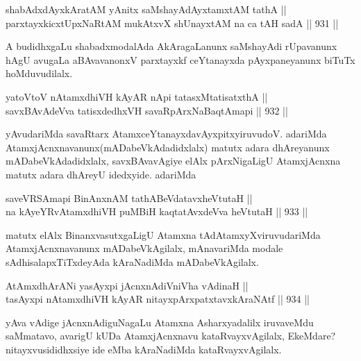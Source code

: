 
\begin{shl}
shabAdxdAyxkAratAM yAnitx saMshayAdAyxtamxtAM tathA ||  \\
parxtayxkicxtUpxNaRtAM mukAtxvX shUnayxtAM na ca tAH sadA \hfill || 931 ||  
\end{shl}

\begin{artha}
A budidhxgaLu shabadxmodalAda AkAragaLanunx saMshayAdi rUpavanunx hAgU avugaLa aBAvavanonxV parxtayxkf ceYtanayxda pAyxpaneyanunx biTuTx hoMduvudilalx.
\end{artha}


\begin{shl}
yatoV\s toV nA\s \s tamxdhiVH kAyAR nApi tatasxMtatisatxthA || \\
savxBAvAdeVva tatisxdedhxVH savaRpArxNaBaqtAmapi \hfill || 932 ||  
\end{shl}

\begin{artha}
yAvudariMda savaRtarx AtamxceYtanayxdavAyxpitxyiruvudoV. adariMda AtamxjAcnxnavanunx(mADabeVkAdadidxlalx) matutx adara dhAreyanunx mADabeVkAdadidxlalx, savxBAvavAgiye elAlx pArxNigaLigU AtamxjAcnxna matutx adara dhAreyU idedxyide. adariMda
\end{artha}

\begin{shl}
saveVRSAmapi BinAnxnAM tathA\s BeVdatavxheVtutaH || \\
na kAyeYRvA\s \s tamxdhiVH puMBiH kaqtatAvxdeVva heVtutaH \hfill || 933 ||  
\end{shl}

\begin{artha}
matutx elAlx BinanxvasutxgaLigU Atamxna tAdAtamxyXviruvudariMda AtamxjAcnxnavanunx mADabeVkAgilalx, mAnavariMda modale sAdhisalapxTiTxdeyAda kAraNadiMda mADabeVkAgilalx.
\end{artha}


\begin{shl}
AtAmxdhArANi yasAyxpi jAcnxnAdiVniVha vAdinaH || \\
tasAyxpi nA\s \s tamxdhiVH kAyAR nitayxpArxpatxtavxkAraNAtf \hfill || 934 ||  
\end{shl}

\begin{artha}
yAva vAdige jAcnxnAdiguNagaLu Atamxna Asharxyadalilx iruvaveMdu saMmatavo, avarigU kUDa AtamxjAcnxnavu kataRvayxvAgilalx, EkeMdare? nitayxvusididhxsiye ide eMba kAraNadiMda kataRvayxvAgilalx.
\end{artha}

